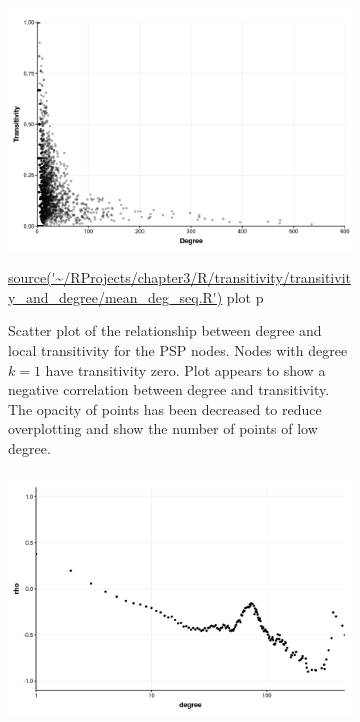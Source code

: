\begin{figure}
    \centering
    \begin{subfigure}[t]{0.45\textwidth}
        \centering
        \includegraphics[width=\textwidth]{images/chapter3/ggplot2/degree_and_transitivity/Rplot_scatterplot_c_and_degree_new_format.png}
\caption{Scatter plot of the relationship between degree and local transitivity for the PSP nodes. Nodes with degree $k=1$ have transitivity zero. Plot appears to show a negative correlation between degree and transitivity. The opacity of points has been decreased to reduce overplotting and show the number of points of low degree. }
 \tiny\url{source('~/RProjects/chapter3/R/transitivity/transitivity_and_degree/mean_deg_seq.R')} plot p
    \label{fig:Scatter plot of the relationship between degree and local transitivity for the PSP nodes}
    \end{subfigure}
    \hfill
    \begin{subfigure}[t]{0.45\textwidth}
        \centering
        \includegraphics[width=\textwidth]{images/chapter3/ggplot2/degree_and_transitivity/Rplot_rho_and_starting_degree_transitivity.png}

\end{subfigure}
\end{figure}
